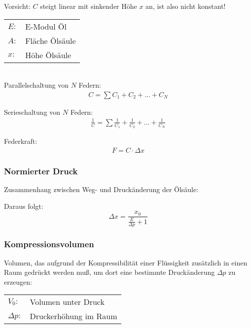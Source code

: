 Vorsicht: $C$ steigt linear mit sinkender Höhe $x$ an, ist also nicht konstant!

\begin{tabular}{ll}
$E:$ & E-Modul Öl \\
$A:$ & Fläche Ölsäule \\
$x:$ & Höhe Ölsäule
\end{tabular} \\


Parallelschaltung von $N$ Federn:
\begin{align*}
C = \sum C_1  + C_2 + \hdots + C_N
\end{align*}


Serieschaltung von $N$ Federn:
\begin{align*}
\frac{1}{C} = \sum \frac{1}{C_1} + \frac{1}{C_2} + \hdots + \frac{1}{C_N}
\end{align*}


Federkraft:
\begin{align*}
F = C \cdot \Delta x
\end{align*}




\subsubsection{Normierter Druck}
Zusammenhang zwischen Weg- und Druckänderung der Ölsäule:

Daraus folgt:
$$\Delta x = \frac{x_0}{\frac{E}{\Delta p} + 1}$$

\subsubsection{Kompressionsvolumen}
Volumen, das aufgrund der Kompressibilität einer Flüssigkeit zusätzlich in einen Raum gedrückt werden muß, um dort eine bestimmte Druckänderung $\Delta p$ zu erzeugen:

\begin{tabular}{ll}
$V_0:$ & Volumen unter Druck \\
$\Delta p:$ &Druckerhöhung im Raum
\end{tabular}

